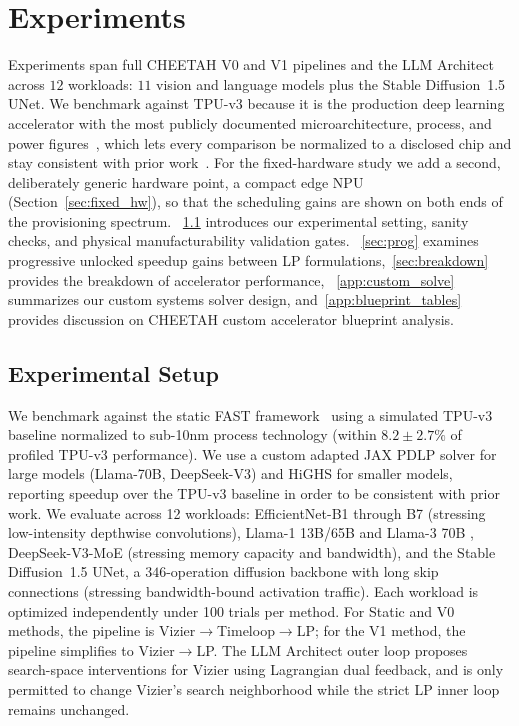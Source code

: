 \section{Experiments}
\label{sec:experiments}
Experiments span full CHEETAH V0 and V1 pipelines and the LLM Architect across $12$ workloads: $11$ vision and language models plus the Stable Diffusion~1.5 UNet. We benchmark against TPU-v3 because it is the production deep learning accelerator with the most publicly documented microarchitecture, process, and power figures~\citep{jouppi2017datacenter,jouppi2021ten}, which lets every comparison be normalized to a disclosed chip and stay consistent with prior work~\citep{zhang_fast}. For the fixed-hardware study we add a second, deliberately generic hardware point, a compact edge NPU (Section~\ref{sec:fixed_hw}), so that the scheduling gains are shown on both ends of the provisioning spectrum.
~\cref{sec:exp_intro} introduces our experimental setting, sanity checks, and physical manufacturability validation gates.
~\cref{sec:prog} examines progressive unlocked speedup gains between LP formulations,~\cref{sec:breakdown} provides the breakdown of accelerator performance,
~\cref{app:custom_solve} summarizes our custom systems solver design, and~\cref{app:blueprint_tables} provides discussion on CHEETAH custom accelerator blueprint analysis.




\subsection{Experimental Setup}
\label{sec:exp_intro}
We benchmark against the static FAST framework~\citep{zhang_fast} using a simulated TPU-v3 \citep{jouppi2021ten} baseline normalized to sub-10nm process technology (within $8.2 \pm 2.7\%$ of profiled TPU-v3 performance). We use a custom adapted JAX PDLP solver for large models (Llama-70B, DeepSeek-V3) and HiGHS \citep{huangfu2018parallel} for smaller models, reporting speedup over the TPU-v3 baseline in order to be consistent with prior work.
We evaluate across 12 workloads: EfficientNet-B1 \citep{tan2019efficientnet} through B7 (stressing low-intensity depthwise convolutions), Llama-1 13B/65B and Llama-3 70B \citep{llama3modelcard}, DeepSeek-V3-MoE \citep{deepseekv3report} (stressing memory capacity and bandwidth), and the Stable Diffusion~1.5 UNet, a $346$-operation diffusion backbone with long skip connections (stressing bandwidth-bound activation traffic). Each workload is optimized independently under 100 trials per method. For Static and V0 methods, the pipeline is Vizier$\to$Timeloop$\to$LP; for the V1 method, the pipeline simplifies to Vizier$\to$LP. 
The LLM Architect outer loop proposes search-space interventions for Vizier using Lagrangian dual feedback, and is only permitted to change Vizier's search neighborhood while the strict LP inner loop remains unchanged.

